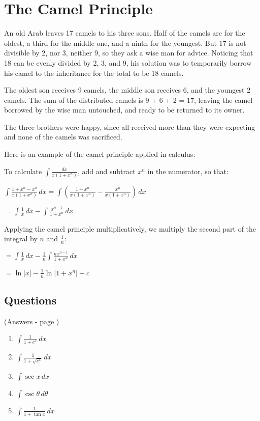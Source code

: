 \documentclass[../main.tex]{subfiles}
\begin{document}
\section{The Camel Principle}
An old Arab leaves 17 camels to his three sons. Half of the camels are for the oldest, a third for the middle one, and a ninth for the youngest. But 17 is not divisible by 2, nor 3, neither 9, so they ask a wise man for advice. Noticing that 18 can be evenly divided by 2, 3, and 9, his solution was to temporarily borrow his camel to the inheritance for the total to be 18 camels.

The oldest son receives 9 camels, the middle son receives 6, and the youngest 2 camels. The sum of the distributed camels is 9 + 6 + 2 = 17, leaving the camel borrowed by the wise man untouched, and ready to be returned to its owner.

The three brothers were happy, since all received more than they were expecting and none of the camels was sacrificed.

Here is an example of the camel principle applied in calculus:

To calculate \(\int \frac{dx}{x(1+x^n)}\), add and subtract \(x^n\) in the numerator, so that:

\(\int \frac{1+x^n-x^n}{x(1+x^n)}\,dx=\int (\frac{1+x^n}{x(1+x^n)}-\frac{x^n}{x(1+x^n)})\,dx\)

\(=\int \frac{1}{x}\,dx-\int \frac{x^{n-1}}{1+x^n}\,dx\)

Applying the camel principle multiplicatively, we multiply the second part of the integral by \(n\) and \(\frac{1}{n}\):

\(=\int \frac{1}{x}\,dx-\frac{1}{n}\int \frac{nx^{n-1}}{1+x^n}\,dx\)

\(=\ln{|x|}-\frac{1}{n}\ln{|1+x^n|}+c\)

\pagebreak

\subsection*{Questions}
(Answers - page \pageref*{Camel principle answers})
\label{Camel Principle}

\begin{enumerate}
    \item \(\int \frac{1}{1+e^x}\,dx\)
    
    \item \(\int \frac{1}{1+\sqrt{e^x}}\,dx\)
    
    \item \(\int \sec{x}\,dx\)
    
    \item \(\int \csc{\theta}\,d\theta\)
    
    \item $\int \frac{1}{1+\tan{x}}\,dx$

\end{enumerate}
\end{document}
